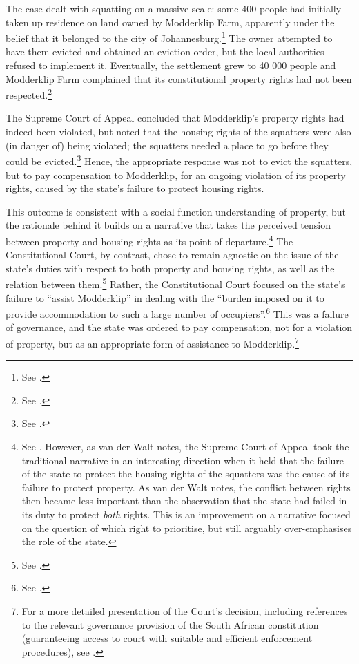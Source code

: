 The case dealt with squatting on a massive scale: some 400 people had initially taken up residence on land owned by Modderklip Farm, apparently under the belief that it belonged to the city of Johannesburg.\footnote{See \cite[4]{modderklip05}.} The owner attempted to have them evicted and obtained an eviction order, but the local authorities refused to implement it. Eventually, the settlement grew to 40 000 people and Modderklip Farm complained that its constitutional property rights had not been respected.\footnote{See \cite[8]{modderklip05}.}

The Supreme Court of Appeal concluded that Modderklip's property rights had indeed been violated, but noted that the housing rights of the squatters were also (in danger of) being violated; the squatters needed a place to go before they could be evicted.\footnote{See \cite[21-26]{modderklip04}.} Hence, the appropriate response was not to evict the squatters, but to pay compensation to Modderklip, for an ongoing violation of its property rights, caused by the state's failure to protect housing rights.

This outcome is consistent with a social function understanding of property, but the rationale behind it builds on a narrative that takes the perceived tension between property and housing rights as its point of departure.\footnote{See \cite[152-156]{walt05}. However, as van der Walt notes, the Supreme Court of Appeal took the traditional narrative in an interesting direction when it held that the failure of the state to protect the housing rights of the squatters was the cause of its failure to protect property. As van der Walt notes, the conflict between rights then became less important than the observation that the state had failed in its duty to protect {\it both} rights. This is an improvement on a narrative focused on the question of which right to prioritise, but still arguably over-emphasises the role of the state.} The Constitutional Court, by contrast, chose to remain agnostic on the issue of the state's duties with respect to both property and housing rights, as well as the relation between them.\footnote{See \cite[25]{modderklip05}.} Rather, the Constitutional Court focused on the state's failure to ``assist Modderklip'' in dealing with the ``burden imposed on it to provide accommodation to such a large number of occupiers''.\footnote{See \cite[49]{modderklip05}.} This was a failure of governance, and the state was ordered to pay compensation, not for a violation of property, but as an appropriate form of assistance to Modderklip.\footnote{For a more detailed presentation of the Court's decision, including references to the relevant governance provision of the South African constitution (guaranteeing access to court with suitable and efficient enforcement procedures), see \cite[156-158]{walt05}.} 


